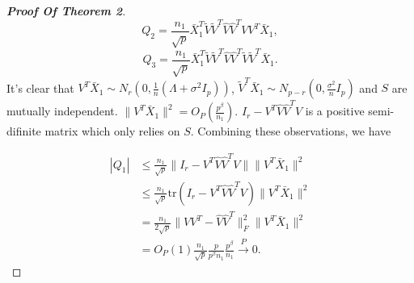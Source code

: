 \begin{proof}[\textbf{Proof Of Theorem 2}]
    \begin{equation*}
        Q_2=\frac{n_1}{\sqrt{p}}\bar{X}_1^T \tilde{V}\tilde{V}^T\hat{V}\hat{V}^T VV^T \bar{X}_1,
    \end{equation*}
    \begin{equation*}
        Q_3=\frac{n_1}{\sqrt{p}}\bar{X}_1^T \tilde{V}\tilde{V}^T\hat{V}\hat{V}^T \tilde{V}\tilde{V}^T \bar{X}_1.
    \end{equation*}
    It's clear that $V^T \bar{X}_1 \sim N_r(0,\frac{1}{n}(\Lambda+\sigma^2 I_p))$, $\tilde{V}^T \bar{X}_1 \sim N_{p-r}(0,\frac{\sigma^2 }{n}I_p)$ and $S$ are mutually independent.  $\|V^T\bar{X}_1\|^2=O_P(\frac{p^{\beta}}{n_1})$.  $I_r-V^T \hat{V}\hat{V}^T V$ is a positive semi-difinite matrix which only relies  on $S$. Combining these observations, we have
    

    \begin{equation}\label{myQ1}
        \begin{aligned}
            |Q_1|&\leq \frac{n_1}{\sqrt{p}}\|I_r-V^T \hat{V}\hat{V}^T V\| \|V^T\bar{X}_1\|^2\\
            &\leq \frac{n_1}{\sqrt{p}}\mathrm{tr}(I_r-V^T \hat{V}\hat{V}^T V) \|V^T\bar{X}_1\|^2\\
            &=\frac{n_1}{2\sqrt{p}}\|VV^T -\hat{V}\hat{V}^T\|^2_F \|V^T\bar{X}_1\|^2\\
            &=O_P(1)\frac{n_1}{\sqrt{p}}\frac{p}{p^{\beta}n_1}\frac{p^\beta}{n_1}\xrightarrow{P}0.
        \end{aligned}
    \end{equation}


\end{proof}
